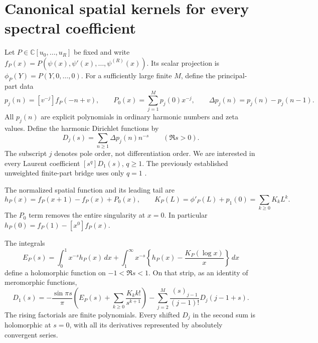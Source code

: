 \section{Canonical spatial kernels for every spectral coefficient}
\label{log:section}

Let $P\in\mathbb C[u_0,\ldots,u_R]$ be fixed and write
$f_P(x)=P(\psi(x),\psi'(x),\ldots,\psi^{(R)}(x))$.
Its scalar projection is $\phi_P(Y)=P(Y,0,\ldots,0)$.
For a sufficiently large finite $M$, define the principal-part data
\[
 p_j(n)=[v^{-j}]f_P(-n+v),\qquad
 P_0(x)=\sum_{j=1}^M p_j(0)x^{-j},\qquad
 \Delta p_j(n)=p_j(n)-p_j(n-1).
\]
All $p_j(n)$ are explicit polynomials in ordinary harmonic numbers
and zeta values. Define the harmonic Dirichlet functions by
\begin{equation}\label{log:Dirichlet}
 D_j(s)=\sum_{n\ge1}\Delta p_j(n)n^{-s}\qquad(\Re s>0).
\end{equation}
The subscript $j$ denotes pole order, not differentiation order.
We are interested in every Laurent coefficient $[s^q]D_1(s)$,
$q\ge1$. The previously established unweighted finite-part bridge
uses only $q=1$ \cite{DPL,PTI}.

The normalized spatial function and its leading tail are
\begin{equation}\label{log:hK}
 h_P(x)=f_P(x+1)-f_P(x)+P_0(x),\qquad
 K_P(L)=\phi'_P(L)+p_1(0)=\sum_{k\ge0}K_kL^k.
\end{equation}
The $P_0$ term removes the entire singularity at $x=0$.
In particular $h_P(0)=f_P(1)-[x^0]f_P(x)$.

\begin{theorem}
\label{log:Mellin}
The integrals
\begin{equation}\label{log:E}
 E_P(s)=\int_0^1 x^{-s}h_P(x)\,dx
  +\int_1^\infty x^{-s}
       \left\{h_P(x)-\frac{K_P(\log x)}x\right\}\,dx
\end{equation}
define a holomorphic function on $-1<\Re s<1$.
On that strip, as an identity of meromorphic functions,
\begin{equation}\label{log:master}
 \boxed{\displaystyle
 D_1(s)=-\frac{\sin\pi s}{\pi}
       \left(E_P(s)+\sum_{k\ge0}\frac{K_k k!}{s^{k+1}}\right)
 -\sum_{j=2}^M\frac{(s)_{j-1}}{(j-1)!}D_j(j-1+s).}
\end{equation}
The rising factorials are finite polynomials.
Every shifted $D_j$ in the second sum is holomorphic at $s=0$,
with all its derivatives represented by absolutely convergent series.
\end{theorem}

